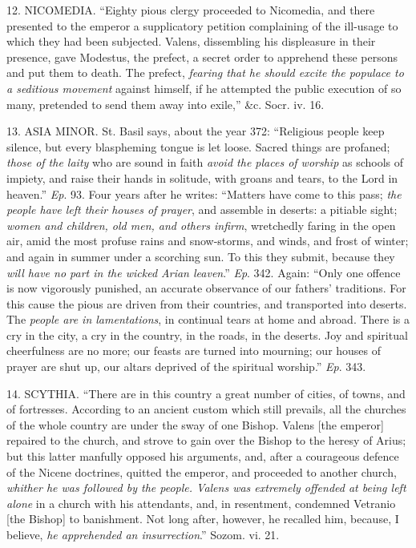 12. NICOMEDIA.
``Eighty pious clergy proceeded to Nicomedia, and there presented to the
emperor a supplicatory petition complaining of the ill-usage to which
they had been subjected. Valens, dissembling his displeasure in their
presence, gave Modestus, the prefect, a secret order to apprehend these
persons and put them to death. The prefect, \emph{fearing that he should
excite the populace to a seditious movement} against himself, if he
attempted the public execution of so many, pretended to send them away
into exile,'' \&c. Socr. iv. 16.

13. ASIA
MINOR.
St. Basil says, about the year 372: ``Religious people keep silence, but
every blaspheming tongue is let loose. Sacred things are profaned; \emph{those
of the laity} who are sound in faith \emph{avoid the places of worship}
as schools of impiety, and raise their hands in solitude, with groans
and tears, to the Lord in heaven.'' \emph{Ep}. 93. Four years after he
writes: ``Matters have come to this pass; \emph{the people have left their
houses of prayer}, and assemble in deserts: a pitiable sight; \emph{women
and children, old men, and others infirm}, wretchedly faring in the
open air, amid the most profuse rains and snow-storms, and winds, and
frost of winter; and again in summer under a scorching sun. To this they
submit, because they \emph{will have no part in the wicked Arian leaven}.''
\emph{Ep}. 342. Again: ``Only one offence is now vigorously punished, an
accurate observance of our fathers' traditions. For this cause the pious
are driven from their countries, and transported into deserts. The \emph{people are in lamentations}, in continual tears at home and
abroad. There is a cry in the city, a cry in the country, in the roads,
in the deserts. Joy and spiritual cheerfulness are no more; our feasts
are turned into mourning; our houses of prayer are shut up, our altars
deprived of the spiritual worship.'' \emph{Ep}. 343.

14. SCYTHIA.
``There are in this country a great number of cities, of towns, and of
fortresses. According to an ancient custom which still prevails, all the
churches of the whole country are under the sway of one Bishop. Valens
[the emperor] repaired to the church, and strove to gain over the Bishop
to the heresy of Arius; but this latter manfully opposed his arguments,
and, after a courageous defence of the Nicene doctrines, quitted the
emperor, and proceeded to another church, \emph{whither he was followed by
the people. Valens was extremely offended at being left alone} in a
church with his attendants, and, in resentment, condemned Vetranio [the
Bishop] to banishment. Not long after, however, he recalled him,
because, I believe, \emph{he apprehended an insurrection}.'' Sozom. vi.
21.

